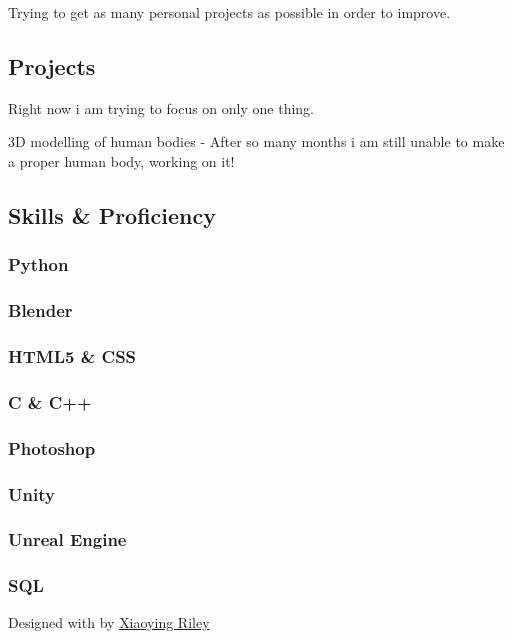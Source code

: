 \documentclass[english,]{article}
\begin{document}
Trying to get as many personal projects as possible in order to improve.

\hypertarget{projects}{%
\subsection{\texorpdfstring{{ \emph{} \emph{} }
Projects}{    Projects}}\label{projects}}

Right now i am trying to focus on only one thing.

{ 3D modelling of human bodies } - {After so many months i am still
unable to make a proper human body, working on it!}

\hypertarget{skills-proficiency}{%
\subsection{\texorpdfstring{{ \emph{} \emph{} } Skills \&
Proficiency}{    Skills \& Proficiency}}\label{skills-proficiency}}

\hypertarget{python}{%
\subsubsection{Python}\label{python}}

\hypertarget{blender}{%
\subsubsection{Blender}\label{blender}}

\hypertarget{html5-css}{%
\subsubsection{HTML5 \& CSS}\label{html5-css}}

\hypertarget{c-c}{%
\subsubsection{C \& C++}\label{c-c}}

\hypertarget{photoshop}{%
\subsubsection{Photoshop}\label{photoshop}}

\hypertarget{unity}{%
\subsubsection{Unity}\label{unity}}

\hypertarget{unreal-engine}{%
\subsubsection{Unreal Engine}\label{unreal-engine}}

\hypertarget{sql}{%
\subsubsection{SQL}\label{sql}}

{Designed with \emph{} by \href{http://themes.3rdwavemedia.com}{Xiaoying
Riley}}
\end{document}
